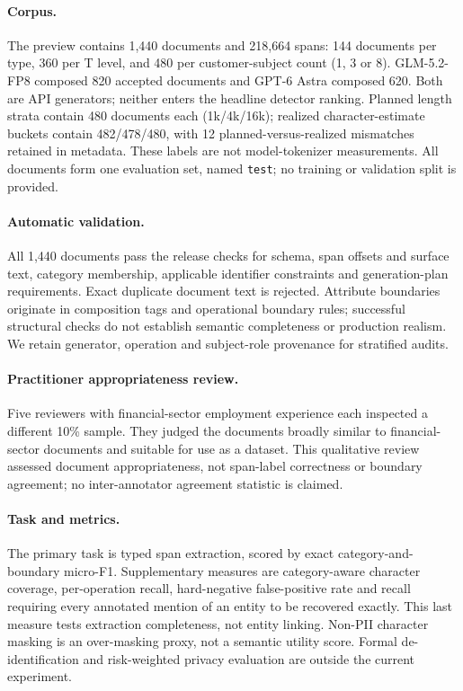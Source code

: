 \paragraph{Corpus.}
The preview contains 1,440 documents and 218,664 spans: 144 documents per type, 360 per T level, and 480 per customer-subject count (1, 3 or 8). GLM-5.2-FP8 composed 820 accepted documents and GPT-6 Astra composed 620. Both are API generators; neither enters the headline detector ranking. Planned length strata contain 480 documents each (1k/4k/16k); realized character-estimate buckets contain 482/478/480, with 12 planned-versus-realized mismatches retained in metadata. These labels are not model-tokenizer measurements. All documents form one evaluation set, named \texttt{test}; no training or validation split is provided.

\paragraph{Automatic validation.}
All 1,440 documents pass the release checks for schema, span offsets and surface text, category membership, applicable identifier constraints and generation-plan requirements. Exact duplicate document text is rejected. Attribute boundaries originate in composition tags and operational boundary rules; successful structural checks do not establish semantic completeness or production realism. We retain generator, operation and subject-role provenance for stratified audits.

\paragraph{Practitioner appropriateness review.}
Five reviewers with financial-sector employment experience each inspected a different 10\% sample. They judged the documents broadly similar to financial-sector documents and suitable for use as a dataset. This qualitative review assessed document appropriateness, not span-label correctness or boundary agreement; no inter-annotator agreement statistic is claimed.

\paragraph{Task and metrics.}
The primary task is typed span extraction, scored by exact category-and-boundary micro-F1. Supplementary measures are category-aware character coverage, per-operation recall, hard-negative false-positive rate and recall requiring every annotated mention of an entity to be recovered exactly. This last measure tests extraction completeness, not entity linking. Non-PII character masking is an over-masking proxy, not a semantic utility score. Formal de-identification and risk-weighted privacy evaluation are outside the current experiment.
